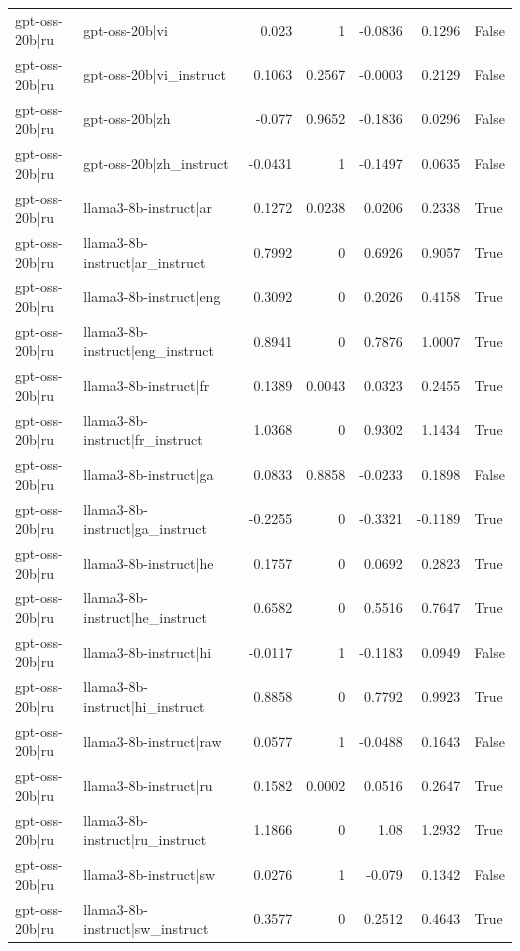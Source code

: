 \begin{table}
\begin{tabular}{l l r r r r l}
gpt-oss-20b|ru & gpt-oss-20b|vi & 0.023 & 1 & -0.0836 & 0.1296 & False \\
gpt-oss-20b|ru & gpt-oss-20b|vi_instruct & 0.1063 & 0.2567 & -0.0003 & 0.2129 & False \\
gpt-oss-20b|ru & gpt-oss-20b|zh & -0.077 & 0.9652 & -0.1836 & 0.0296 & False \\
gpt-oss-20b|ru & gpt-oss-20b|zh_instruct & -0.0431 & 1 & -0.1497 & 0.0635 & False \\
gpt-oss-20b|ru & llama3-8b-instruct|ar & 0.1272 & 0.0238 & 0.0206 & 0.2338 & True \\
gpt-oss-20b|ru & llama3-8b-instruct|ar_instruct & 0.7992 & 0 & 0.6926 & 0.9057 & True \\
gpt-oss-20b|ru & llama3-8b-instruct|eng & 0.3092 & 0 & 0.2026 & 0.4158 & True \\
gpt-oss-20b|ru & llama3-8b-instruct|eng_instruct & 0.8941 & 0 & 0.7876 & 1.0007 & True \\
gpt-oss-20b|ru & llama3-8b-instruct|fr & 0.1389 & 0.0043 & 0.0323 & 0.2455 & True \\
gpt-oss-20b|ru & llama3-8b-instruct|fr_instruct & 1.0368 & 0 & 0.9302 & 1.1434 & True \\
gpt-oss-20b|ru & llama3-8b-instruct|ga & 0.0833 & 0.8858 & -0.0233 & 0.1898 & False \\
gpt-oss-20b|ru & llama3-8b-instruct|ga_instruct & -0.2255 & 0 & -0.3321 & -0.1189 & True \\
gpt-oss-20b|ru & llama3-8b-instruct|he & 0.1757 & 0 & 0.0692 & 0.2823 & True \\
gpt-oss-20b|ru & llama3-8b-instruct|he_instruct & 0.6582 & 0 & 0.5516 & 0.7647 & True \\
gpt-oss-20b|ru & llama3-8b-instruct|hi & -0.0117 & 1 & -0.1183 & 0.0949 & False \\
gpt-oss-20b|ru & llama3-8b-instruct|hi_instruct & 0.8858 & 0 & 0.7792 & 0.9923 & True \\
gpt-oss-20b|ru & llama3-8b-instruct|raw & 0.0577 & 1 & -0.0488 & 0.1643 & False \\
gpt-oss-20b|ru & llama3-8b-instruct|ru & 0.1582 & 0.0002 & 0.0516 & 0.2647 & True \\
gpt-oss-20b|ru & llama3-8b-instruct|ru_instruct & 1.1866 & 0 & 1.08 & 1.2932 & True \\
gpt-oss-20b|ru & llama3-8b-instruct|sw & 0.0276 & 1 & -0.079 & 0.1342 & False \\
gpt-oss-20b|ru & llama3-8b-instruct|sw_instruct & 0.3577 & 0 & 0.2512 & 0.4643 & True \\

\end{tabular}
\end{table}
